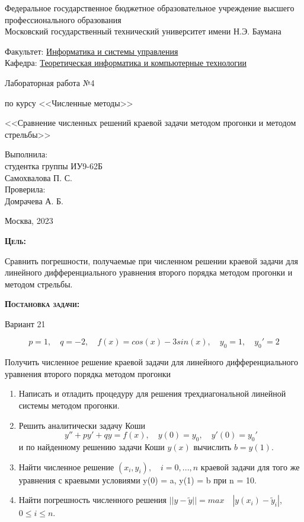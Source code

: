 \documentclass [12pt]{article}
\title{}
\date{}
\author{}
\begin{document}
\begin{titlepage}
\thispagestyle{empty}
\begin{center}
Федеральное государственное бюджетное образовательное учреждение высшего профессионального образования \\Московский государственный технический университет имени Н.Э. Баумана

\end{center}
\bigskip
\begin{flushleft}
Факультет: \underline{Информатика и системы управления}\\
Кафедра: \underline{Теоретическая информатика и компьютерные технологии}
\end{flushleft}
\vfill
\centerline{\large{Лабораторная работа №4}}
\centerline{\large{по курсу <<Численные методы>>}}
\centerline{\large{<<Сравнение численных решений краевой задачи методом прогонки и методом стрельбы>>}}
\vfill
\hfill\parbox{5cm} {
           Выполнила:\\
           студентка группы ИУ9-62Б \hfill \\
           Самохвалова П. С.\hfill \medskip\\
           Проверила:\\
           Домрачева А. Б.\hfill
       }
\centerline{Москва, 2023}
\clearpage
\end{titlepage}

\textsc{\textbf{Цель:}}

Сравнить погрешности, получаемые при численном решении краевой задачи для линейного дифференциального уравнения второго порядка методом прогонки и методом стрельбы.

\textsc{\textbf{Постановка задачи:}}

Вариант 21

$$p = 1, \quad q = -2, \quad f(x) = cos(x) - 3sin(x), \quad y_0 = 1, \quad y_0' = 2$$

Получить численное решение краевой задачи для линейного дифференциального уравнения второго порядка методом прогонки

\begin{enumerate}
    \item Написать и отладить процедуру для решения трехдиагональной линейной системы методом прогонки.
    \item Решить аналитически задачу Коши $$y'' + py' + qy = f(x), \quad y(0) = y_0, \quad y'(0) = y_0'$$ и по найденному решению задачи Коши $y(x)$ вычислить $b=y(1)$.
    \item Найти численное решение $(x_i, y_i), \quad i = 0, ..., n$ краевой задачи для того же уравнения с краевыми условиями y(0) = a, y(1) = b при n = 10.
    \item Найти погрешность численного решения $||y - \widetilde{y}|| = max \quad |y(x_i) - \widetilde{y}_i|$, \quad $0 \leq i \leq n$.
\end{enumerate}
\end{document}
